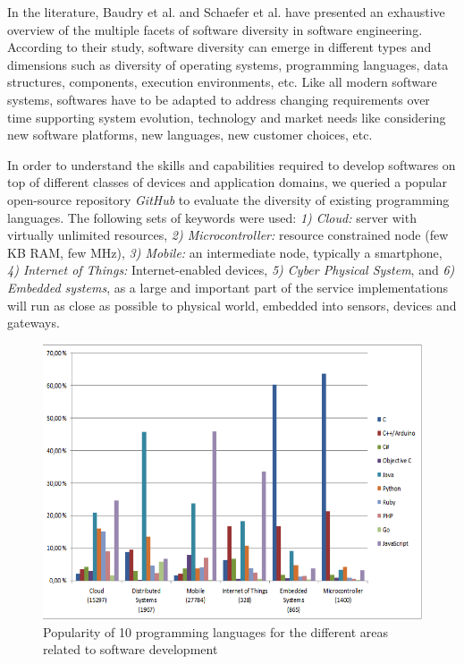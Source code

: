 In the literature, Baudry et al.\cite{baudry2015multiple} and Schaefer et al.\cite{schaefer2012software} have presented an exhaustive overview of the multiple facets of software diversity in software engineering. 
According to their study, software diversity can emerge in different types and dimensions such as diversity of operating systems, programming languages, data structures, components, execution environments, etc. 
Like all modern software systems, softwares have to be adapted to address changing requirements over time supporting system evolution, technology and market needs like considering new software platforms, new languages, new customer choices, etc.

In order to understand the skills and capabilities required to develop softwares on top of different classes of devices and application domains, we queried a popular open-source repository \textit{GitHub} to evaluate the diversity of existing programming languages.  
The following sets of keywords were used: \textit{1) Cloud:} server with virtually unlimited resources, \textit{2) Microcontroller:} resource constrained node (few KB RAM, few MHz),  \textit{3) Mobile:} an intermediate node, typically a smartphone,  \textit{4) Internet of Things:} Internet-enabled devices,  \textit{5) Cyber Physical System}, and  \textit{6) Embedded systems}, as a large and important part of the service implementations will run as close as possible to physical world, embedded into sensors, devices and gateways.

\begin{figure}[h]
	\center
	\includegraphics[scale=1.]{Background/fig/github}
	\caption{Popularity of 10 programming languages for the different areas related to software development}
	\label{fig:github}
\end{figure}

